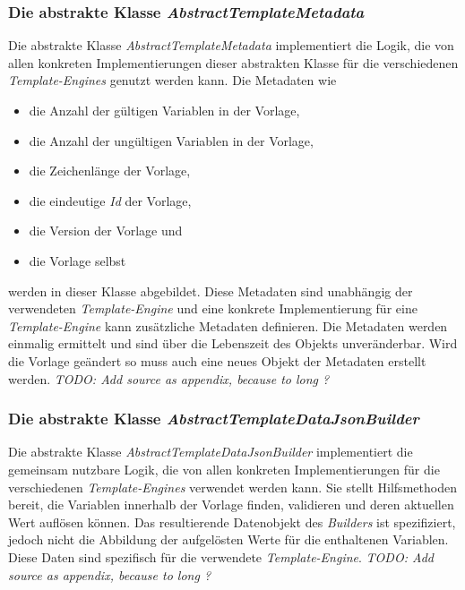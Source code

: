 \subsubsection{Die abstrakte Klasse \emph{AbstractTemplateMetadata}}
\label{sec:abstractTemplateMetadata}
Die abstrakte Klasse \emph{AbstractTemplateMetadata} implementiert die Logik, die von allen konkreten Implementierungen dieser abstrakten Klasse für die verschiedenen \emph{Template-Engines} genutzt werden kann. Die Metadaten wie
\begin{itemize}
	\item die Anzahl der gültigen Variablen in der Vorlage,
	\item die Anzahl der ungültigen Variablen in der Vorlage,
	\item die Zeichenlänge der Vorlage,
	\item die eindeutige \emph{Id} der Vorlage,
	\item die Version der Vorlage und
	\item die Vorlage selbst
\end{itemize}
werden in dieser Klasse abgebildet. Diese Metadaten sind unabhängig der verwendeten \emph{Template-Engine} und eine konkrete Implementierung für eine \emph{Template-Engine} kann zusätzliche Metadaten definieren. Die Metadaten werden einmalig ermittelt und sind über die Lebenszeit des Objekts unveränderbar. Wird die Vorlage geändert so muss auch eine neues Objekt der Metadaten erstellt werden.
\newline
\newline
\emph{TODO: Add source as appendix, because to long ?}

\subsubsection{Die abstrakte Klasse \emph{AbstractTemplateDataJsonBuilder}}
\label{sec:abstractTemplateDataJsonBuilder}
Die abstrakte Klasse \emph{AbstractTemplateDataJsonBuilder} implementiert die gemeinsam nutzbare Logik, die von allen konkreten Implementierungen für die verschiedenen \emph{Template-Engines} verwendet werden kann. Sie stellt Hilfsmethoden bereit, die Variablen innerhalb der Vorlage finden, validieren und deren aktuellen Wert auflösen können. Das resultierende Datenobjekt des \emph{Builders} ist spezifiziert, jedoch nicht die Abbildung der aufgelösten Werte für die enthaltenen Variablen. Diese Daten sind spezifisch für die verwendete \emph{Template-Engine}.
\newline 
\newline  
\emph{TODO: Add source as appendix, because to long ?}

